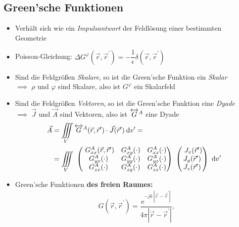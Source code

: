 \subsection{Green'sche Funktionen}
\begin{itemize}
    \itemsep1pt
    \item Verhält sich wie ein \textit{Impulsantwort} der Feldlösung einer bestimmten Geometrie
    \item Poisson-Gleichung: \(\Delta G^\varphi(\vec{r}, \vec{r}^\prime) = -\dfrac{1}{\epsilon}\delta(\vec{r}, \vec{r}^\prime)\)
    \item Sind die Feldgrößen \textit{Skalare}, so ist die Green'sche Funktion ein \textit{Skalar}\\
        $\implies$ $\rho$ und $\varphi$ sind Skalare, also ist $G^\varphi$ ein Skalarfeld
    \item Sind die Feldgrößen \textit{Vektoren}, so ist die Green'sche Funktion eine \textit{Dyade}\\
        $\implies$ $\vec{J}$ und $\vec{A}$ sind Vektoren, also ist $\overleftrightarrow{G}^A$ eine Dyade
        \begin{align*}
            \vec{A} &= \iiint\limits_V \overleftrightarrow{G}^A(\vec{r},\vec{r}^\prime) \cdot \vec{J}(\vec{r}^\prime)\:\mathrm{d}v^\prime =\\
            &= \iiint\limits_V\
            \begin{pmatrix}\
                G^A_{xx}(\vec{r},\vec{r}^\prime) & G^A_{xy}(\cdot) & G^A_{xz}(\cdot)\\
                G^A_{yx}(\cdot) & G^A_{yy}(\cdot) & G^A_{yz}(\cdot)\\
                G^A_{zx}(\cdot) & G^A_{zy}(\cdot) & G^A_{zz}(\cdot)
            \end{pmatrix}\
            \begin{pmatrix}\
                J_x(\vec{r}^\prime)\\
                J_y(\vec{r}^\prime)\\
                J_z(\vec{r}^\prime)
            \end{pmatrix}\
            \mathrm{d}v^\prime
        \end{align*}
    \item Green'sche Funktionen \textbf{des freien Raumes:}\\
        \begin{align*}
            &G(\vec{r},\vec{r}^\prime) = \dfrac{\mathrm{e}^{-jk\:|\vec{r} - \vec{r}^\prime|}}{4\pi|\vec{r} - \vec{r}^\prime|},\\

\end{align*}
\end{itemize}
